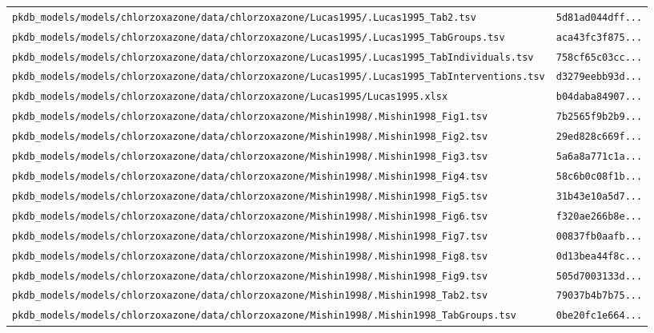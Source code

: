\begin{longtable}{ll}
\texttt{pkdb\_models/models/chlorzoxazone/data/chlorzoxazone/Lucas1995/.Lucas1995\_Tab2.tsv} & \texttt{5d81ad044dff...} \\
\texttt{pkdb\_models/models/chlorzoxazone/data/chlorzoxazone/Lucas1995/.Lucas1995\_TabGroups.tsv} & \texttt{aca43fc3f875...} \\
\texttt{pkdb\_models/models/chlorzoxazone/data/chlorzoxazone/Lucas1995/.Lucas1995\_TabIndividuals.tsv} & \texttt{758cf65c03cc...} \\
\texttt{pkdb\_models/models/chlorzoxazone/data/chlorzoxazone/Lucas1995/.Lucas1995\_TabInterventions.tsv} & \texttt{d3279eebb93d...} \\
\texttt{pkdb\_models/models/chlorzoxazone/data/chlorzoxazone/Lucas1995/Lucas1995.xlsx} & \texttt{b04daba84907...} \\
\texttt{pkdb\_models/models/chlorzoxazone/data/chlorzoxazone/Mishin1998/.Mishin1998\_Fig1.tsv} & \texttt{7b2565f9b2b9...} \\
\texttt{pkdb\_models/models/chlorzoxazone/data/chlorzoxazone/Mishin1998/.Mishin1998\_Fig2.tsv} & \texttt{29ed828c669f...} \\
\texttt{pkdb\_models/models/chlorzoxazone/data/chlorzoxazone/Mishin1998/.Mishin1998\_Fig3.tsv} & \texttt{5a6a8a771c1a...} \\
\texttt{pkdb\_models/models/chlorzoxazone/data/chlorzoxazone/Mishin1998/.Mishin1998\_Fig4.tsv} & \texttt{58c6b0c08f1b...} \\
\texttt{pkdb\_models/models/chlorzoxazone/data/chlorzoxazone/Mishin1998/.Mishin1998\_Fig5.tsv} & \texttt{31b43e10a5d7...} \\
\texttt{pkdb\_models/models/chlorzoxazone/data/chlorzoxazone/Mishin1998/.Mishin1998\_Fig6.tsv} & \texttt{f320ae266b8e...} \\
\texttt{pkdb\_models/models/chlorzoxazone/data/chlorzoxazone/Mishin1998/.Mishin1998\_Fig7.tsv} & \texttt{00837fb0aafb...} \\
\texttt{pkdb\_models/models/chlorzoxazone/data/chlorzoxazone/Mishin1998/.Mishin1998\_Fig8.tsv} & \texttt{0d13bea44f8c...} \\
\texttt{pkdb\_models/models/chlorzoxazone/data/chlorzoxazone/Mishin1998/.Mishin1998\_Fig9.tsv} & \texttt{505d7003133d...} \\
\texttt{pkdb\_models/models/chlorzoxazone/data/chlorzoxazone/Mishin1998/.Mishin1998\_Tab2.tsv} & \texttt{79037b4b7b75...} \\
\texttt{pkdb\_models/models/chlorzoxazone/data/chlorzoxazone/Mishin1998/.Mishin1998\_TabGroups.tsv} & \texttt{0be20fc1e664...} \\

\end{longtable}
